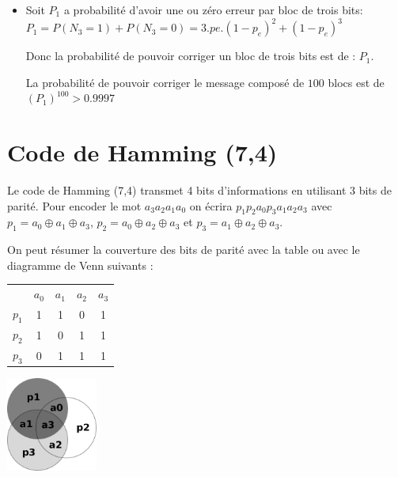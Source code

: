 \documentclass[a4paper,10pt]{exam}
\begin{document}
\begin{enumerate}
\begin{solution}
\begin{itemize}
        \item Soit $P_1$ a probabilité d'avoir une ou zéro erreur par bloc de trois bits:
          $ P_1 = P(N_3=1) + P(N_3=0) = 3.pe.(1-p_e)^2 + (1-p_e)^3$

          Donc la probabilité de pouvoir corriger un bloc de trois bits
          est de : $P_1$.

          La probabilité de pouvoir corriger le message composé de $100$
          blocs est de
          $(P_1)^{100} > 0.9997$
        \end{itemize}
    \end{solution}
\end{enumerate}

\section{Code de Hamming (7,4)}
Le code de Hamming (7,4) transmet 4 bits d'informations en utilisant 3 bits de
parité.
Pour encoder le mot $a_3a_2a_1a_0$ on écrira $p_1p_2a_0p_3a_1a_2a_3$
avec $p_1 = a_0 \oplus a_1 \oplus a_3$, $p_2 = a_0 \oplus a_2 \oplus a_3$
et $p_3 = a_1 \oplus a_2 \oplus a_3$.

On peut résumer la couverture des bits de parité avec la table
ou avec le diagramme de Venn suivants :

\begin{center}
  \begin{minipage}{0.4\textwidth}
\begin{tabular}{lcccc}
      & $a_0$ & $a_1$ & $a_2$ & $a_3$ \\
$p_1$ &   1   &   1   &   0   &   1   \\
$p_2$ &   1   &   0   &   1   &   1   \\
$p_3$ &   0   &   1   &   1   &   1   \\
\end{tabular}
\end{minipage}
\begin{minipage}{0.4\textwidth}
  \includegraphics[width=3cm]{venn-hamming}
\end{minipage}
\end{center}
\end{document}
